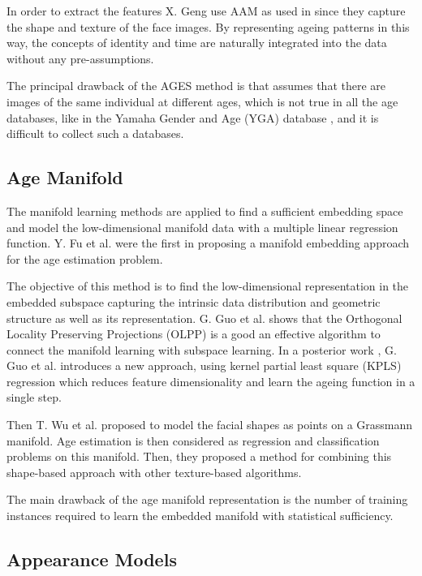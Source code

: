 In order to extract the features X. Geng use AAM as used in \cite{791208} since they capture the shape and texture of the face images. By representing ageing patterns in this way, the concepts of identity and time are naturally integrated into the data without any pre-assumptions.

The principal drawback of the AGES method is that assumes that there are images of the same individual at different ages, which is not true in all the age databases, like in the Yamaha Gender and Age (YGA) database \cite{4523958}, and it is difficult to collect such a databases.

\subsection{Age Manifold}
 
The manifold learning methods are applied to find a sufficient embedding space and model the low-dimensional manifold data with a multiple linear regression function. Y. Fu et al. \cite{4523958, 4284917} were the first in proposing a manifold embedding approach for the age estimation problem. 

The objective of this method is to find the low-dimensional representation in the embedded subspace capturing the intrinsic data distribution and geometric structure as well as its representation. G. Guo et al. \cite{Guo:2008:IHA:2319085.2321608} \cite{4531189} shows that the Orthogonal Locality Preserving Projections (OLPP) \cite{CHHZ06}  is a good an effective algorithm  to connect the manifold learning with subspace learning. In a posterior work \cite{5995404}, G. Guo et al. introduces a new approach, using kernel partial least square (KPLS) regression which reduces feature dimensionality and learn the ageing function in a single step.

Then T. Wu et al. \cite{journals/tifs/WuTC12} proposed to model the facial shapes as points on a Grassmann manifold. Age estimation is then considered as regression and classification problems on this manifold. Then, they proposed a method for combining this shape-based approach with other texture-based algorithms.

The main drawback of the age manifold representation is the number of training instances required to learn the embedded manifold with statistical sufficiency.

\subsection{Appearance Models}

